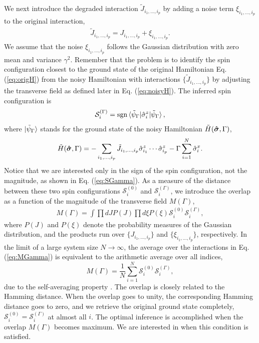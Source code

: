 \documentclass[aps,pra,twocolumn,groupedaddress,longbibliography]{revtex4}
\def\v#1{\mbox{\boldmath $#1$}}
\newcommand{\Sig}{\sigma}
\begin{document}
We next introduce the degraded interaction $\tilde{J}_{i_1, \ldots, i_p}$ by adding a noise term $\xi_{i_1, \ldots, i_p}$ to the original interaction,
\begin{align}
	\tilde{J}_{i_1, \ldots, i_p} = J_{i_1, \ldots, i_p} + \xi_{i_1, \ldots, i_p}.
\end{align}
We assume that the noise $\xi_{i_1, \ldots, i_p}$ follows the Gaussian distribution with zero mean and variance $\gamma^2$. Remember that the problem is to identify the spin configuration closest to the ground state of the original Hamiltonian Eq. (\ref{eq:origH}) from the noisy Hamiltonian with interactions $\{\tilde{J}_{i_1, \ldots, i_p}\}$ by adjusting the transverse field  as defined later in Eq. (\ref{eq:noisyH}). The inferred spin configuration is
\begin{align}
	\label{eq:SGamma}
	\mathcal{S}^{(\Gamma)}_i = \mathrm{sgn} \braket{\tilde{\psi}_\Gamma|\hat{\Sig}^z_i|\tilde{\psi}_\Gamma},
\end{align}
where $\ket{\tilde{\psi}_\Gamma}$ stands for the ground state of the noisy Hamiltonian $\tilde{H}(\v{\hat{\Sig}},\Gamma )$,
\begin{align}
	\label{eq:noisyH}
	\tilde{H}(\v{\hat{\Sig}}, \Gamma) = -\sum_{i_1, \ldots, i_p}\tilde{J}_{i_1, \ldots, i_p}\hat{\Sig}^z_{i_1}\cdots \hat{\Sig}^z_{i_p}-\Gamma \sum_{i=1}^N\hat{\Sig}^x_{i}.
\end{align}
Notice that we are interested only in the sign of the spin configuration, not the magnitude, as shown in Eq. (\ref{eq:SGamma}).
As a measure of the distance between these two spin configurations $\mathcal{S}^{(0)}_i$ and $\mathcal{S}^{(\Gamma)}_i$, we introduce the overlap as a function of the magnitude of the transverse field $M(\Gamma)$,
\begin{align}
	\label{eq:MGamma}
	M(\Gamma) = \int \prod dJ P(J)\prod d\xi P(\xi) \mathcal{S}^{(0)}_i \mathcal{S}^{(\Gamma)}_i,
\end{align}
where $P(J)$ and $P(\xi)$ denote the probability measures of the Gaussian distribution, and the products run over $\{J_{i_1, \ldots, i_p}\}$ and $\{\xi_{i_1, \ldots, i_p}\}$, respectively. In the limit of a large system size $N\to\infty$, the average over the interactions in Eq. (\ref{eq:MGamma}) is equivalent to the arithmetic average over all indices,
\begin{equation}
    M(\Gamma) = \frac{1}{N}\sum_{i=1}^N\mathcal{S}^{(0)}_i \mathcal{S}^{(\Gamma)}_i,
\end{equation}
due to the self-averaging property \cite{nsmrbook}. The overlap is closely related to the Hamming distance.  When the overlap goes to unity, the corresponding Hamming distance goes to zero, and we retrieve the original ground state completely, $\mathcal{S}^{(0)}_i  = \mathcal{S}^{(\Gamma)}_i$ at almost all $i$. The optimal inference is accomplished when the overlap $M(\Gamma)$ becomes maximum. We are interested in when this condition is satisfied.
\end{document}
